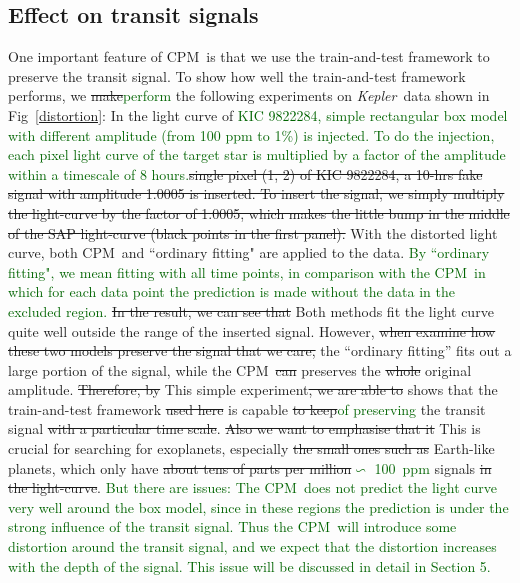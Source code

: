 \documentclass[12pt, preprint]{aastex}
\newcommand{\project}[1]{\textsl{#1}}
\newcommand{\Kepler}{\project{Kepler}}
\newcommand{\name}{CPM}
\newcommand{\revise}[1]{\textcolor{darkgreen}{#1}}
\newcommand{\remove}[1]{\sout{#1}}
\begin{document}
\subsection{Effect on transit signals}
One important feature of \name\ is that we use the train-and-test framework to preserve 
the transit signal. To show how well the train-and-test framework performs, we \remove{make}\revise{perform} the
following experiments on \Kepler\ data shown in Fig~\ref{distortion}:
In the light curve of \revise{KIC 9822284, simple rectangular box model with different amplitude (from 100 ppm to 1\%) is injected. To do the injection, each pixel light curve of the target star is multiplied by a factor of the amplitude within a timescale of 8 hours.}\remove{single pixel (1, 2) of KIC 9822284, a 10-hrs fake signal 
with amplitude 1.0005 is inserted. To insert the signal, we simply multiply the light-curve 
by the factor of 1.0005, which makes the little bump in the middle of the SAP light-curve 
(black points in the first panel).} With the distorted light curve, both \name\ and ``ordinary fitting" are applied to the data. 
\revise{By ``ordinary fitting", we mean fitting with all time points,  in comparison with the \name\, in which for each data point the prediction is made without the data in the excluded region.}  
\remove{In the result, we can see that} Both methods fit the light curve quite well outside the range of the inserted signal. 
However, \remove{when examine how these two models preserve the signal that we care,} the ``ordinary fitting'' fits out a large portion of the signal, while the \name\ \remove{can} preserves the \remove{whole} original amplitude. 
\remove{Therefore,  by} This simple experiment\remove{, we are able to} shows that the train-and-test framework \remove{used here} is capable \remove{to keep}\revise{of preserving} the transit signal \remove{with a particular time scale}. 
\remove{Also we want to emphasise that it} This is crucial for searching for
exoplanets, especially \remove{the small ones such as} Earth-like planets, which only have \remove{about tens of parts per million}\revise{$\backsim$ 100\ ppm} signals \remove{in the light-curve}. \revise{But there are issues: 
The \name\ does not predict the light curve very well around the box model, since in these regions the prediction is under the strong influence of the transit signal. 
Thus the \name\ will introduce some distortion around the transit signal, and \revise{we expect that} the distortion increases with the depth of the signal. This issue will be discussed in detail in Section 5.}
\end{document}
